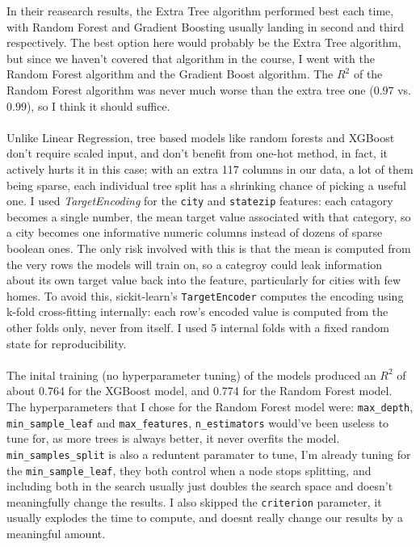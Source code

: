 \documentclass[14pt]{article}
\begin{document}
	In their reasearch results, the Extra Tree algorithm performed best each time, with Random Forest and Gradient Boosting usually landing in second and third respectively. The best option here would probably be the Extra Tree algorithm,
	but since we haven't covered that algorithm in the course, I went with the Random Forest algorithm and the Gradient Boost algorithm.
	The $R^2$ of the Random Forest algorithm was never much worse than the extra tree one ($0.97$ vs. $0.99$), so I think it should suffice.
	\\\\
	Unlike Linear Regression, tree based models like random forests and XGBoost don't require scaled input, and don't benefit from one-hot method, in fact,
	it actively hurts it in this case; with an extra 117 columns in our data, a lot of them being sparse, each individual tree split has a shrinking chance of picking a useful one.
	I used \emph{TargetEncoding} for the \texttt{city} and \texttt{statezip} features: each catagory becomes a single number, the mean target value associated with that category,
	so a city becomes one informative numeric columns instead of dozens of sparse boolean ones. The only risk involved with this is that the mean is computed from the very rows the models will train on,
	so a categroy could leak information about its own target value back into the feature, particularly for cities with few homes. To avoid this, sickit-learn's \texttt{TargetEncoder} computes the encoding using k-fold cross-fitting internally:
	each row's encoded value is computed from the other folds only, never from itself. I used 5 internal folds with a fixed random state for reproducibility.
	\\\\
	The inital training (no hyperparameter tuning) of the models produced an $R^2$ of about 0.764 for the XGBoost model, and 0.774 for the Random Forest model.
	The hyperparameters that I chose for the Random Forest model were: \texttt{max\_depth}, \texttt{min\_sample\_leaf} and \texttt{max\_features}, \texttt{n\_estimators} would've been useless to tune for, as more trees is always better, it never overfits the model. \\
	\texttt{min\_samples\_split} is also a reduntent paramater to tune, I'm  already tuning for the \texttt{min\_sample\_leaf}, they both control when a node stops splitting, and including both in the search usually just doubles the search space and doesn't meaningfully change the results.
	I also skipped the \texttt{criterion} parameter, it usually explodes the time to compute, and doesnt really change our results by a meaningful amount.
\end{document}
